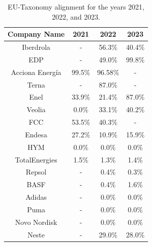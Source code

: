 \documentclass[times]{oupau}
\begin{document}
\begin{table}
    \centering
    \begin{tabular}{cccc}
\textbf{Company Name}      & \textbf{2021} & \textbf{2022} & \textbf{2023} \\ \hline
Iberdrola         & -     & 56.3\%      & 40.4\%     \\ \hline
EDP               & -     &   49.0\%   &  99.8\%    \\ \hline
Acciona Energía   &    99.5\%  &  96.58\%    &   -   \\ \hline
Terna             &    -  &   87.0\%   &   -   \\ \hline
Enel              &   33.9\%   &   21.4\%   &  87.0\%    \\ \hline
Veolia            &    0.0\%  &  33.1\%    &  40.2\%    \\ \hline
FCC               &    53.5\%  &  40.3\%    &   -   \\ \hline
Endesa            &    27.2\%  &  10.9\%    &  15.9\%    \\ \hline
HYM               &    0.0\%  &   0.0\%   &  0.0\%    \\ \hline
TotalEnergies     &   1.5\%   &  1.3\%    &  1.4\%    \\ \hline
Repsol            &   -   &  0.4\%    &   0.3\%   \\ \hline
BASF              &   -   &  0.4\%    &  1.6\%    \\ \hline
Adidas            &  -  &   0.0\%   &   0.0\%   \\ \hline
Puma              &   -  &   0.0\%   &   0.0\% \\ \hline
Novo Nordisk      &    -  &   0.0\%   &   0.0\% \\ \hline
Neste             &    -  &   29.0\%   &    28.0\%  \\ \hline
\end{tabular}
\caption{EU-Taxonomy alignment for the years 2021, 2022, and 2023.}
    \label{tab:my_label}
\end{table}
\end{document}
